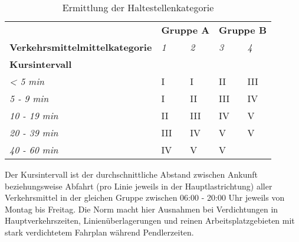 \begin{table}[ht]
    \begin{tabular}[c]{l | p{2.3cm} p{2.3cm} | p{2.3cm} p{2.3cm}}
        \midrule
        \textbf{}
                                & \multicolumn{2}{l|}{\textbf{Gruppe A}}
                                & \multicolumn{2}{l}{\textbf{Gruppe B}}\\
        \textbf{Verkehrsmittelmittelkategorie}
                                & \textit{1}
                                & \textit{2}
                                & \textit{3}
                                & \textit{4}\\
        \textbf{Kursintervall}
                                &
                                &
                                &
                                &\\
        \textit{< 5 min}
                                & I
                                & I
                                & II
                                & III\\
        \textit{5 - 9 min}
                                & I
                                & II
                                & III
                                & IV\\
        \textit{10 - 19 min}
                                & II
                                & III
                                & IV
                                & V\\
        \textit{20 - 39 min}
                                & III
                                & IV
                                & V
                                & V\\
        \textit{40 - 60 min}
                                & IV
                                & V
                                & V
                                &\\
        \bottomrule
    \end{tabular}
    \caption{Ermittlung der Haltestellenkategorie}
    \label{table:Ermittlung der Haltestellenkategorie}
\end{table}

Der Kursintervall ist der durchschnittliche Abstand zwischen Ankunft beziehungsweise Abfahrt (pro Linie jeweils in der Hauptlastrichtung) aller Verkehrsmittel in der gleichen Gruppe zwischen 06:00 - 20:00 Uhr jeweils von Montag bis Freitag.
Die Norm macht hier Ausnahmen bei Verdichtungen in Hauptverkehrszeiten, Linienüberlagerungen und reinen Arbeitsplatzgebieten mit stark verdichtetem Fahrplan während Pendlerzeiten.

